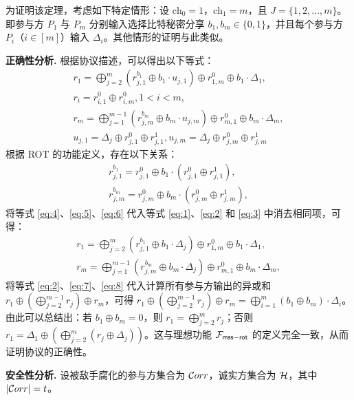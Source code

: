 为证明该定理，考虑如下特定情形：设 $\text{ch}_0 = 1$，$\text{ch}_1 = m$，且 $J = \{1,2,\ldots,m\}$。即参与方 $P_1$ 与 $P_m$ 分别输入选择比特秘密分享 $b_1,b_m \in \{0,1\}$，并且每个参与方 $P_i$（$i \in [m]$）输入 $\Delta_i$。其他情形的证明与此类似。

\begin{trivlist}
\item \textbf{正确性分析.} 根据协议描述，可以得出以下等式：
\begin{gather}
    r_1 = \bigoplus_{j=2}^{m}(r_{j,1}^{b_1} \oplus b_1 \cdot u_{j,1}) \oplus r_{1,m}^0 \oplus b_1 \cdot \Delta_1,  \label{eq:1} \\
    r_i = r_{i,1}^0 \oplus r_{i,m}^0 , 1 < i < m, \label{eq:2} \\
    r_m = \bigoplus_{j=1}^{m-1}(r_{j,m}^{b_m} \oplus b_m \cdot u_{j,m}) \oplus r_{m,1}^0 \oplus b_m \cdot \Delta_m, \label{eq:3} \\
    u_{j,1} = \Delta_j \oplus r_{j,1}^0 \oplus r_{j,1}^1, 
    u_{j,m} = \Delta_j \oplus r_{j,m}^0 \oplus r_{j,m}^1\label{eq:4}
\end{gather}
根据 ROT 的功能定义，存在以下关系：
\begin{gather}
r_{j,1}^{b_1} = r_{j,1}^0 \oplus b_1 \cdot (r_{j,1}^0 \oplus r_{j,1}^1),\label{eq:5} \\
r_{j,m}^{b_m} = r_{j,m}^0 \oplus b_m \cdot (r_{j,m}^0 \oplus r_{j,m}^1),\label{eq:6} 
\end{gather}
将等式 \eqref{eq:4}、\eqref{eq:5}、\eqref{eq:6} 代入等式 \eqref{eq:1}、\eqref{eq:2} 和 \eqref{eq:3} 中消去相同项，可得：
\begin{gather}
    r_1 = \bigoplus_{j=2}^{m}(r_{j,1}^{b_1} \oplus b_1 \cdot \Delta_j) \oplus r_{1,m}^0 \oplus b_1 \cdot \Delta_1,  \label{eq:7} \\
    r_m = \bigoplus_{j=1}^{m-1}(r_{j,m}^{b_m} \oplus b_m \cdot \Delta_j) \oplus r_{m,1}^0 \oplus b_m \cdot \Delta_m, \label{eq:8} 
\end{gather}
将等式 \eqref{eq:2}、\eqref{eq:7}、\eqref{eq:8} 代入计算所有参与方输出的异或和 $r_1 \oplus (\bigoplus_{j=2}^{m-1}r_j) \oplus r_m$，可得 
$r_1 \oplus (\bigoplus_{j=2}^{m-1}r_j) \oplus r_m = \bigoplus_{i=1}^{m} (b_1 \oplus b_m) \cdot \Delta_i$。由此可以总结出：若 $b_1 \oplus b_m = 0$，则 $r_1 = \bigoplus_{j=2}^m r_j$；否则 $r_1 = \Delta_1 \oplus (\bigoplus_{j=2}^m (r_j \oplus \Delta_j))$。这与理想功能 $\mathcal{F}_\mathsf{mss\mathsf{-}rot}$ 的定义完全一致，从而证明协议的正确性。

\item \textbf{安全性分析.} 
设被敌手腐化的参与方集合为 $\mathcal{C}orr$，诚实方集合为 $\mathcal{H}$，其中 $\lvert \mathcal{C}orr \rvert = t$。


\end{trivlist}
